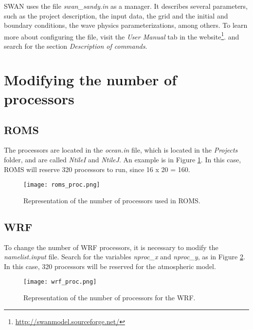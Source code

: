\noindent SWAN uses the file \textit{swan\_sandy.in} as a manager. It describes several parameters,
such as the project description, the input data, the grid and the initial and boundary conditions, the
wave physics parameterizations, among others. To learn more about configuring the file, visit the \textit{User Manual} tab
in the website\textcolor{bleu_cite}{\textit{}\footnote{\textcolor{bleu_cite}{\href{http://swanmodel.sourceforge.net/}{http://swanmodel.sourceforge.net/}}}}.
and search for the section \textit{Description of commands}.
\bigskip

\section{Modifying the number of processors}
\bigskip

\subsection{ROMS}
\bigskip

\noindent The processors are located in the \textit{ocean.in} file, which is located in the \textit{Projects} folder,
and are called \textit{NtileI} and \textit{NtileJ}. An example is in Figure \textcolor{bleu_cite}{\ref{romsproc}}.
In this case, ROMS will reserve 320 processors to run, since 16 x 20 = 160.

\bigskip

\begin{figure}[H]
    \centering
    \texttt{[image: roms\_proc.png]}
    \caption{Representation of the number of processors used in ROMS.}
    \label{romsproc}
\end{figure}
\bigskip

\subsection{WRF}
\bigskip

\noindent To change the number of WRF processors, it is necessary to modify the \textit{namelist.input} file.
Search for the variables \textit{nproc\_x} and \textit{nproc\_y}, as in Figure \textcolor{bleu_cite}{\ref{procswrf}}.
In this case, 320 processors will be reserved for the atmospheric model.

\begin{figure}[H]
    \centering
    \texttt{[image: wrf\_proc.png]}
    \caption{Representation of the number of processors for the WRF.}
    \label{procswrf}
\end{figure}
\bigskip

